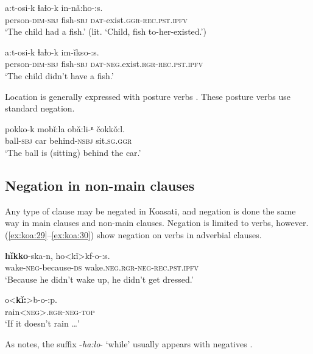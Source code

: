 \documentclass[output=paper,colorlinks,citecolor=brown]{langscibook}
\begin{document}
\ea\label{ex:koa:28}
    \ea\label{ex:koa:28a}
        \gll a:t-osi-k  ɬaɬo-k  in-nǎ:ho-:s. \\ 
             person-\textsc{dim}-\textsc{sbj}  fish-\textsc{sbj}  \textsc{dat}-exist.\textsc{ggr}-\textsc{rec.pst}.\textsc{ipfv} \\
        \glt ‘The child had a fish.’ (lit. ‘Child, fish to-her-existed.’)
    
    \ex\label{ex:koa:28b}
        \gll a:t-osi-k  ɬaɬo-k   im-ǐkso-:s. \\
             person-\textsc{dim}-\textsc{sbj}  fish-\textsc{sbj}  \textsc{dat}-\textsc{neg}.exist.\textsc{rgr}-\textsc{rec.pst}.\textsc{ipfv} \\
        \glt ‘The child didn’t have a fish.’
    \z
\z 

Location is generally expressed with posture verbs . These posture verbs use standard negation.

\ea\label{ex:koasati:new29}
    \gll pokko-k  mobǐ:la  obǎ:li-ⁿ           čokkǒ:l.\\
         ball-\textsc{sbj}  car          behind-\textsc{nsbj}  sit.\textsc{sg.ggr}\\
    \glt ‘The ball is (sitting) behind the car.’\\
\z 


\subsection{Negation in non-main clauses}\label{sec:koa:2.4}

Any type of clause may be negated in Koasati, and negation is done the same way in main clauses and non-main clauses. Negation is limited to verbs, however. (\ref{ex:koa:29}--\ref{ex:koa:30}) show negation on verbs in adverbial clauses.

\ea\label{ex:koa:29}
    \textbf{hǐkko}-ska-n,  ho<kǐ>kf-o-:s. \\ 
         wake-\textsc{neg}-because-\textsc{ds}  wake.\textsc{neg}.\textsc{rgr}-\textsc{neg}-\textsc{rec.pst}.\textsc{ipfv} \\
    \glt  ‘Because he didn’t wake up, he didn’t get dressed.’
\z 

\ea\label{ex:koa:30}
    \gll o<\textbf{kǐ:}>b-o-:p. \\ 
         rain<\textsc{neg}>.\textsc{rgr}-\textsc{neg}-\textsc{top} \\
    \glt ‘If it doesn’t rain …’
\z 

As \citet[239]{Kimball1991} notes, the suffix -\textit{ha:lo}- ‘while’ usually appears with negatives .
\end{document}
